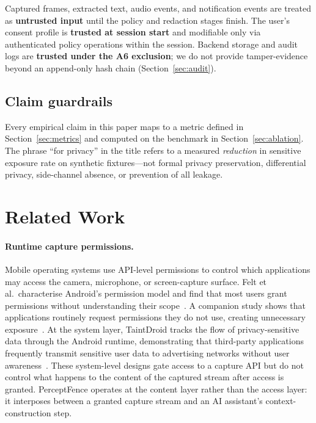 \documentclass[sn-mathphys-num]{sn-jnl}
\begin{document}
Captured frames, extracted text, audio events, and notification events are
treated as \textbf{untrusted input} until the policy and redaction stages
finish.
The user's consent profile is \textbf{trusted at session start} and
modifiable only via authenticated policy operations within the session.
Backend storage and audit logs are \textbf{trusted under the A6 exclusion};
we do not provide tamper-evidence beyond an append-only hash chain
(Section~\ref{sec:audit}).

\subsection{Claim guardrails}\label{sec:guardrails}

Every empirical claim in this paper maps to a metric defined in
Section~\ref{sec:metrics} and computed on the benchmark in
Section~\ref{sec:ablation}.
The phrase ``for privacy'' in the title refers to a measured \textit{reduction}
in sensitive exposure rate on synthetic fixtures---not formal privacy
preservation, differential privacy, side-channel absence, or prevention of all
leakage.

\section{Related Work}\label{sec:related}

\paragraph{Runtime capture permissions.}
Mobile operating systems use API-level permissions to control which
applications may access the camera, microphone, or screen-capture surface.
Felt et al.\ characterise Android's permission model and find that most users
grant permissions without understanding their scope~\cite{felt2012permissions}.
A companion study shows that applications routinely request permissions they do
not use, creating unnecessary exposure~\cite{felt2011android}.
At the system layer, TaintDroid tracks the flow of privacy-sensitive data
through the Android runtime, demonstrating that third-party applications
frequently transmit sensitive user data to advertising networks without user
awareness~\cite{enck2014taintdroid}.
These system-level designs gate access to a capture API but do not control
what happens to the content of the captured stream after access is granted.
PerceptFence operates at the content layer rather than the access layer: it
interposes between a granted capture stream and an AI assistant's
context-construction step.
\end{document}
